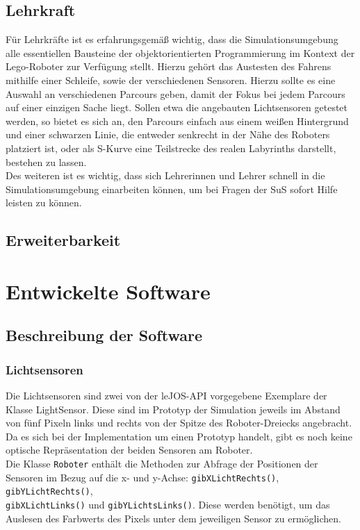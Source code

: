 \documentclass[paper=a4, pagesize, DIV=calc, BCOR=12.5mm, twoside=on, onecolumn=on, open = any, titlepage =on, parskip =half-, headsepline = on, footsepline = on, chapterprefix = on, appendixprefix = off, fontsize = 12pt, numbers = noenddot, abstract = on]{scrbook}
\numberwithin{equation}{chapter}
\theoremstyle{definition}
\theoremstyle{plain}
\theoremstyle{plain}
\theoremstyle{remark}
\theoremstyle{plain}
\theoremstyle{plain}
\begin{document}
\section{Lehrkraft}
\label{sec:lehrkraft}
\par \onehalfspacing
Für Lehrkräfte ist es erfahrungsgemäß wichtig, dass die Simulationsumgebung alle essentiellen Bausteine der objektorientierten Programmierung im Kontext der Lego-Roboter zur Verfügung stellt. Hierzu gehört das Austesten des Fahrens mithilfe einer Schleife, sowie der verschiedenen Sensoren. Hierzu sollte es eine Auswahl an verschiedenen Parcours geben, damit der Fokus bei jedem Parcours auf einer einzigen Sache liegt. Sollen etwa die angebauten Lichtsensoren getestet werden, so bietet es sich an, den Parcours einfach aus einem weißen Hintergrund und einer schwarzen Linie, die entweder senkrecht in der Nähe des Roboters platziert ist, oder als S-Kurve eine Teilstrecke des realen Labyrinths darstellt, bestehen zu lassen.\\
Des weiteren ist es wichtig, dass sich Lehrerinnen und Lehrer schnell in die Simulationsumgebung einarbeiten können, um bei Fragen der SuS sofort Hilfe leisten zu können.

\par \singlespacing
\section{Erweiterbarkeit} \label{sec:erweiterbarkeit}
\onehalfspacing




\chapter{Entwickelte Software}



\section{Beschreibung der Software}

\subsection{Lichtsensoren}
Die Lichtsensoren sind zwei von der leJOS-API vorgegebene Exemplare der Klasse LightSensor. Diese sind im Prototyp der Simulation jeweils im Abstand von fünf Pixeln links und rechts von der Spitze des Roboter-Dreiecks angebracht. Da es sich bei der Implementation um einen Prototyp handelt, gibt es noch keine optische Repräsentation der beiden Sensoren am Roboter.\\
Die Klasse \texttt{Roboter} enthält die Methoden zur Abfrage der Positionen der Sensoren im Bezug auf die x- und y-Achse: \texttt{gibXLichtRechts()}, \texttt{gibYLichtRechts()},\\
\texttt{gibXLichtLinks()} und \texttt{gibYLichtsLinks()}. Diese werden benötigt, um das Auslesen des Farbwerts des Pixels unter dem jeweiligen Sensor zu ermöglichen.
\end{document}
